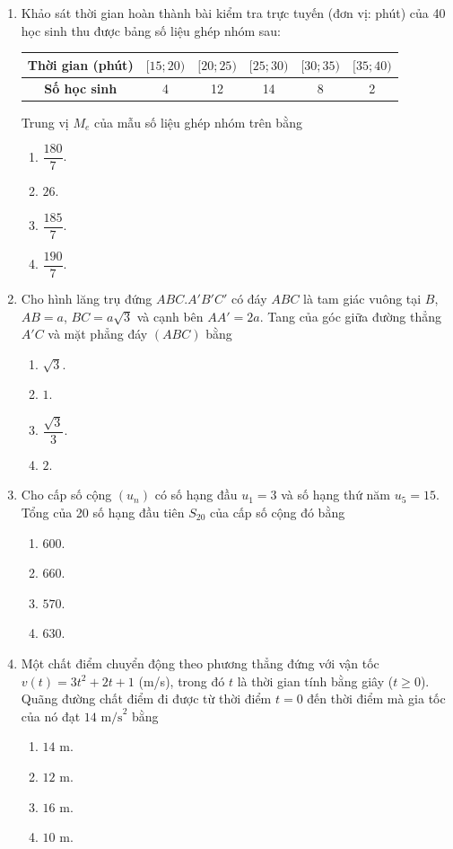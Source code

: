 \documentclass[12pt,a4paper]{article}
\begin{document}
\begin{enumerate}[label=\textbf{Câu \arabic*:}, leftmargin=*]
\item Khảo sát thời gian hoàn thành bài kiểm tra trực tuyến (đơn vị: phút) của 40 học sinh thu được bảng số liệu ghép nhóm sau:
\begin{center}
\begin{tabular}{|c|c|c|c|c|c|}
\hline
\textbf{Thời gian (phút)} & $[15; 20)$ & $[20; 25)$ & $[25; 30)$ & $[30; 35)$ & $[35; 40)$ \\ \hline
\textbf{Số học sinh} & 4 & 12 & 14 & 8 & 2 \\ \hline
\end{tabular}
\end{center}
Trung vị $M_e$ của mẫu số liệu ghép nhóm trên bằng
\begin{enumerate}[label=\Alph*.]
    \item $\dfrac{180}{7}$.
    \item $26$.
    \item $\dfrac{185}{7}$.
    \item $\dfrac{190}{7}$.
\end{enumerate}

\item Cho hình lăng trụ đứng $ABC.A'B'C'$ có đáy $ABC$ là tam giác vuông tại $B$, $AB = a$, $BC = a\sqrt{3}$ và cạnh bên $AA' = 2a$. Tang của góc giữa đường thẳng $A'C$ và mặt phẳng đáy $(ABC)$ bằng
\begin{enumerate}[label=\Alph*.]
    \item $\sqrt{3}$.
    \item $1$.
    \item $\dfrac{\sqrt{3}}{3}$.
    \item $2$.
\end{enumerate}

\item Cho cấp số cộng $(u_n)$ có số hạng đầu $u_1 = 3$ và số hạng thứ năm $u_5 = 15$. Tổng của 20 số hạng đầu tiên $S_{20}$ của cấp số cộng đó bằng
\begin{enumerate}[label=\Alph*.]
    \item $600$.
    \item $660$.
    \item $570$.
    \item $630$.
\end{enumerate}

\item Một chất điểm chuyển động theo phương thẳng đứng với vận tốc $v(t) = 3t^2 + 2t + 1$ (m/s), trong đó $t$ là thời gian tính bằng giây ($t \ge 0$). Quãng đường chất điểm đi được từ thời điểm $t = 0$ đến thời điểm mà gia tốc của nó đạt $14\text{ m/s}^2$ bằng
\begin{enumerate}[label=\Alph*.]
    \item $14\text{ m}$.
    \item $12\text{ m}$.
    \item $16\text{ m}$.
    \item $10\text{ m}$.
\end{enumerate}


\end{enumerate}
\end{document}

